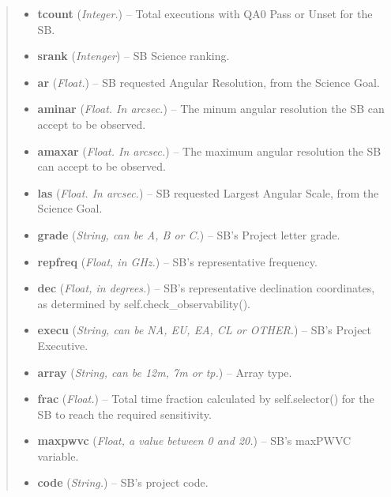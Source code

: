 \documentclass[a4paper,10pt,english]{sphinxmanual}
\begin{document}
\begin{fulllineitems}
\begin{fulllineitems}
\begin{quote}
\begin{description}
\begin{itemize}
\item {} 
\textbf{tcount} (\emph{Integer.}) -- Total executions with QA0 Pass or Unset for the SB.

\item {} 
\textbf{srank} (\emph{Intenger}) -- SB Science ranking.

\item {} 
\textbf{ar} (\emph{Float.}) -- SB requested Angular Resolution, from the Science Goal.

\item {} 
\textbf{aminar} (\emph{Float. In arcsec.}) -- The minum angular resolution the SB can accept to be
observed.

\item {} 
\textbf{amaxar} (\emph{Float. In arcsec.}) -- The maximum angular resolution the SB can accept to be
observed.

\item {} 
\textbf{las} (\emph{Float. In arcsec.}) -- SB requested Largest Angular Scale, from the Science Goal.

\item {} 
\textbf{grade} (\emph{String, can be A, B or C.}) -- SB's Project letter grade.

\item {} 
\textbf{repfreq} (\emph{Float, in GHz.}) -- SB's representative frequency.

\item {} 
\textbf{dec} (\emph{Float, in degrees.}) -- SB's representative declination coordinates, as determined
by self.check\_observability().

\item {} 
\textbf{execu} (\emph{String, can be NA, EU, EA, CL or OTHER.}) -- SB's Project Executive.

\item {} 
\textbf{array} (\emph{String, can be 12m, 7m or tp.}) -- Array type.

\item {} 
\textbf{frac} (\emph{Float.}) -- Total time fraction calculated by self.selector() for the
SB to reach the required sensitivity.

\item {} 
\textbf{maxpwvc} (\emph{Float, a value between 0 and 20.}) -- SB's maxPWVC variable.

\item {} 
\textbf{code} (\emph{String.}) -- SB's project code.

\end{itemize}


\end{description}
\end{quote}
\end{fulllineitems}
\end{fulllineitems}
\end{document}
